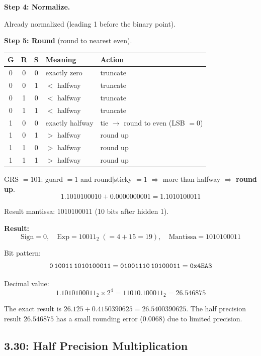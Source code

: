 \noindent\textbf{Step 4: Normalize.}

Already normalized (leading 1 before the binary point).

\noindent\textbf{Step 5: Round} (round to nearest even).

\smallskip
\noindent
\begin{tabular}{@{}c c c l l@{}}
\toprule
G & R & S & Meaning & Action \\
\midrule
0 & 0 & 0 & exactly zero & truncate \\
0 & 0 & 1 & $< $ halfway & truncate \\
0 & 1 & 0 & $< $ halfway & truncate \\
0 & 1 & 1 & $< $ halfway & truncate \\
1 & 0 & 0 & exactly halfway & tie $\to$ round to even (LSB $= 0$) \\
1 & 0 & 1 & $> $ halfway & round up \\
1 & 1 & 0 & $> $ halfway & round up \\
1 & 1 & 1 & $> $ halfway & round up \\
\bottomrule
\end{tabular}
\smallskip

GRS $= 101$: guard $= 1$ and round$\mid$sticky $= 1$
$\Rightarrow$ more than halfway $\Rightarrow$ \textbf{round up}.
\[
  1.1010100010 + 0.0000000001 = 1.1010100011
\]

Result mantissa: $1010100011$ (10 bits after hidden 1).

\noindent\textbf{Result:}
\[
  \text{Sign} = 0,\quad
  \text{Exp} = 10011_2 \;(= 4 + 15 = 19),\quad
  \text{Mantissa} = 1010100011
\]

Bit pattern:
\[
  \texttt{0\,10011\,1010100011}
  = \texttt{01001110\,10100011}
  = \texttt{0x4EA3}
\]

Decimal value:
\[
  1.1010100011_2 \times 2^4
  = 11010.100011_2
  = 26.546875
\]

The exact result is $26.125 + 0.4150390625 = 26.5400390625$. The half
precision result $26.546875$ has a small rounding error ($0.0068$) due to
limited precision.

\subsection*{3.30: Half Precision Multiplication}
\hypertarget{sol-3.30}{}

